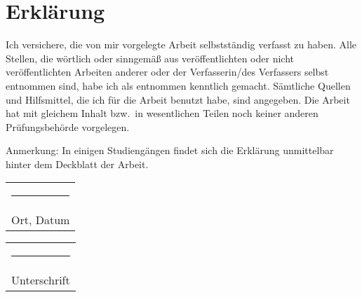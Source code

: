 \chapter*{Erklärung}
%
Ich versichere, die von mir vorgelegte Arbeit selbstständig verfasst zu haben. Alle Stellen, die wörtlich oder sinngemäß aus veröffentlichten oder nicht veröffentlichten Arbeiten anderer oder der Verfasserin/des Verfassers selbst entnommen sind, habe ich als entnommen kenntlich gemacht. Sämtliche Quellen und Hilfsmittel, die ich für die Arbeit benutzt habe, sind angegeben. Die Arbeit hat mit gleichem Inhalt bzw.\ in wesentlichen Teilen noch keiner anderen Prüfungsbehörde vorgelegen.
\par
Anmerkung: In einigen Studiengängen findet sich die Erklärung unmittelbar hinter dem Deckblatt der Arbeit.
\\
%
\begin{tabular}{@{}l@{}}%
\rule{0.35\textwidth}{0.4pt}\\
Ort, Datum%
\end{tabular}%
\hfill%
\begin{tabular}{@{}l@{}}%
\rule{0.45\textwidth}{0.4pt}\\
Unterschrift%
\end{tabular}%